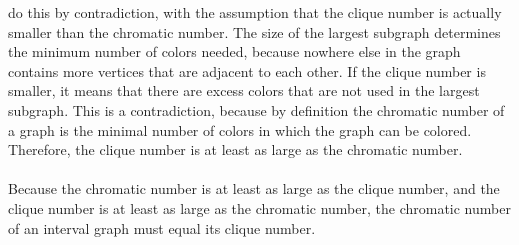 \documentclass[12pt,letterpaper]{cos340hw}
\begin{document}
do this by contradiction, with the assumption that the clique number is actually smaller than the chromatic 
number. The size of the largest subgraph determines the minimum number of colors needed, 
because nowhere else in the graph contains more vertices that are adjacent to each other. If the clique number is smaller, 
it means that there are excess colors that are not used in the largest subgraph. This is a contradiction, because 
by definition the chromatic number of a graph is the minimal number of colors in which the graph can be 
colored. Therefore, the clique number is at least as large as the chromatic number.\\\\
Because the chromatic number is at least as large as the clique number, and the clique number is at least 
as large as the chromatic number, the chromatic number of an interval graph must equal its clique number.


\end{document}

